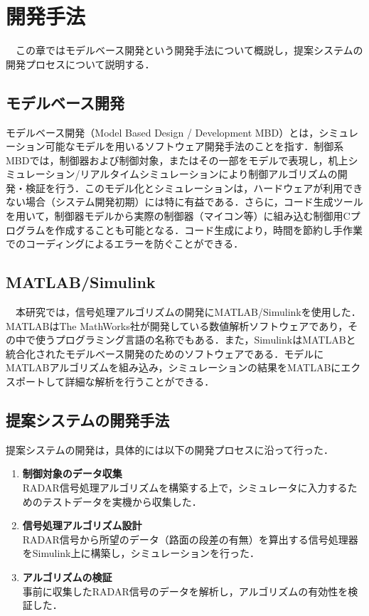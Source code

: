 \chapter{開発手法}
　この章ではモデルベース開発という開発手法について概説し，提案システムの開発プロセスについて説明する．

\section{モデルベース開発}
モデルベース開発（Model Based Design / Development MBD）とは，シミュレーション可能なモデルを用いるソフトウェア開発手法のことを指す．制御系MBDでは，制御器および制御対象，またはその一部をモデルで表現し，机上シミュレーション/リアルタイムシミュレーションにより制御アルゴリズムの開発・検証を行う．このモデル化とシミュレーションは，ハードウェアが利用できない場合（システム開発初期）には特に有益である．さらに，コード生成ツールを用いて，制御器モデルから実際の制御器（マイコン等）に組み込む制御用Cプログラムを作成することも可能となる．コード生成により，時間を節約し手作業でのコーディングによるエラーを防ぐことができる\cite{MBD_Simulink}．

\section{MATLAB/Simulink}
　本研究では，信号処理アルゴリズムの開発にMATLAB/Simulinkを使用した．MATLABはThe MathWorks社が開発している数値解析ソフトウェアであり，その中で使うプログラミング言語の名称でもある\cite{MATLAB_MathWorks}．また，SimulinkはMATLABと統合化されたモデルベース開発のためのソフトウェアである．モデルにMATLABアルゴリズムを組み込み，シミュレーションの結果をMATLABにエクスポートして詳細な解析を行うことができる\cite{Simulink_MathWorks}．

\section{提案システムの開発手法}
提案システムの開発は，具体的には以下の開発プロセスに沿って行った．
\begin{enumerate}
    \item \textbf{制御対象のデータ収集}\\
        RADAR信号処理アルゴリズムを構築する上で，シミュレータに入力するためのテストデータを実機から収集した．
    \item \textbf{信号処理アルゴリズム設計}\\
        RADAR信号から所望のデータ（路面の段差の有無）を算出する信号処理器をSimulink上に構築し，シミュレーションを行った．
    \item \textbf{アルゴリズムの検証}\\
        事前に収集したRADAR信号のデータを解析し，アルゴリズムの有効性を検証した．
\end{enumerate}
